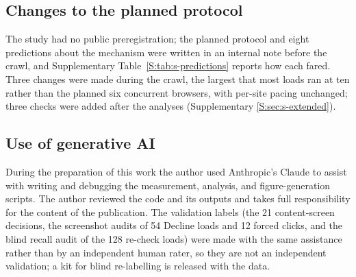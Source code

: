 \subsection{Changes to the planned protocol}\label{sec:method-deviations}

The study had no public preregistration; the planned protocol and eight predictions about the mechanism were written in an internal note before the crawl, and Supplementary Table~\ref*{S:tab:s-predictions} reports how each fared. Three changes were made during the crawl, the largest that most loads ran at ten rather than the planned six concurrent browsers, with per-site pacing unchanged; three checks were added after the analyses (Supplementary \ref*{S:sec:s-extended}).

\subsection{Use of generative AI}\label{sec:method-ai}

During the preparation of this work the author used Anthropic's Claude to assist with writing and debugging the measurement, analysis, and figure-generation scripts. The author reviewed the code and its outputs and takes full responsibility for the content of the publication. The validation labels (the 21 content-screen decisions, the screenshot audits of 54 Decline loads and 12 forced clicks, and the blind recall audit of the 128 re-check loads) were made with the same assistance rather than by an independent human rater, so they are not an independent validation; a kit for blind re-labelling is released with the data.

